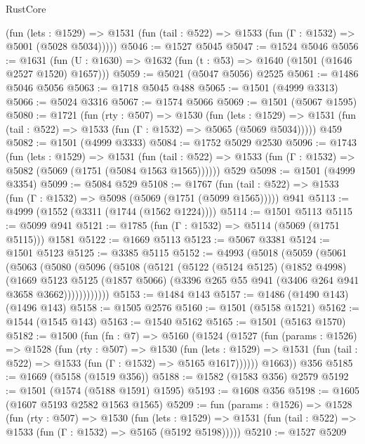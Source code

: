 \begin{lexlean}{RustCore}
\begin{coremodule}
      (fun (lets : @1529) =>
      @1531 (fun (tail : @522) => @1533 (fun (Γ : @1532) => @5001 (@5028 @5034)))))
@5046 := @1527 @5045
@5047 := @1524 @5046
@5056 := @1631 (fun (U : @1630) => @1632 (fun (t : @53) => @1640 (@1501 (@1646 @2527 @1520) @1657)))
@5059 := @5021 (@5047 @5056) @2525
@5061 := @1486 @5046 @5056
@5063 := @1718 @5045 @488
@5065 := @1501 (@4999 @3313)
@5066 := @5024 @3316
@5067 := @1574 @5066
@5069 := @1501 (@5067 @1595)
@5080 := @1721
    (fun (rty : @507) =>
    @1530
      (fun (lets : @1529) =>
      @1531 (fun (tail : @522) => @1533 (fun (Γ : @1532) => @5065 (@5069 @5034)))))
    @459
@5082 := @1501 (@4999 @3333)
@5084 := @1752 @5029 @2530
@5096 := @1743
    (fun (lets : @1529) =>
    @1531
      (fun (tail : @522) => @1533 (fun (Γ : @1532) => @5082 (@5069 (@1751 (@5084 @1563 @1565))))))
    @529
@5098 := @1501 (@4999 @3354)
@5099 := @5084 @529
@5108 := @1767
    (fun (tail : @522) => @1533 (fun (Γ : @1532) => @5098 (@5069 (@1751 (@5099 @1565)))))
    @941
@5113 := @4999 (@1552 (@3311 (@1744 (@1562 @1224))))
@5114 := @1501 @5113
@5115 := @5099 @941
@5121 := @1785 (fun (Γ : @1532) => @5114 (@5069 (@1751 @5115))) @1581
@5122 := @1669 @5113
@5123 := @5067 @3381
@5124 := @1501 @5123
@5125 := @3385 @5115
@5152 := @4993
    (@5018
      (@5059
        (@5061
          (@5063
            (@5080
              (@5096
                (@5108
                  (@5121
                    (@5122
                      (@5124 @5125)
                      (@1852 @4998)
                      (@1669
                        @5123
                        @5125
                        (@1857 @5066)
                        (@3396 @265 @55 @941 (@3406 @264 @941 @3658 @3662))))))))))))
@5153 := @1484 @143
@5157 := @1486 (@1490 @143) (@1496 @143)
@5158 := @1505 @2576
@5160 := @1501 (@5158 @1521)
@5162 := @1544 (@1545 @143)
@5163 := @1540 @5162
@5165 := @1501 (@5163 @1570)
@5182 := @1500
    (fun (fn : @7) =>
    @5160
      (@1524
        (@1527
          (fun (params : @1526) =>
          @1528
            (fun (rty : @507) =>
            @1530
              (fun (lets : @1529) =>
              @1531 (fun (tail : @522) => @1533 (fun (Γ : @1532) => @5165 @1617))))))
        @1663))
    @356
@5185 := @1669 (@5158 (@1519 @356))
@5188 := @1582 (@1583 @356) @2579
@5192 := @1501 (@1574 (@5188 @1591) @1595)
@5193 := @1608 @356
@5198 := @1605 (@1607 @5193 @2582 @1563 @1565)
@5209 := fun (params : @1526) =>
  @1528
    (fun (rty : @507) =>
    @1530
      (fun (lets : @1529) =>
      @1531 (fun (tail : @522) => @1533 (fun (Γ : @1532) => @5165 (@5192 @5198)))))
@5210 := @1527 @5209

\end{coremodule}
\end{lexlean}
